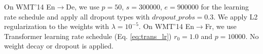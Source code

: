 \documentclass[11pt,a4paper]{article}
\begin{document}
On WMT'14 En$\rightarrow$De, we use $p=50$, $s=300000$, $e=900000$ for
the learning rate schedule and apply all dropout types with
$dropout\_probs=0.3$.  We apply L2 regularization to the weights with
$\lambda=10^{-5}$. On WMT'14 En$\rightarrow$Fr, we use Transformer
learning rate schedule (Eq. \ref{eq:trans_lr}) $r_0=1.0$ and $p=10000$.
No weight decay or dropout is applied.

\end{document}
